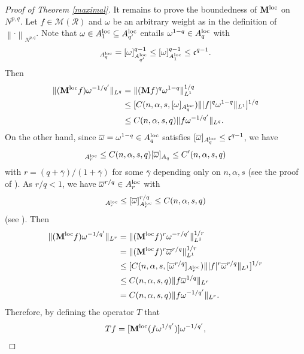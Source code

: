 \documentclass[10pt,reqno]{amsart}
\numberwithin{equation}{section}
\begin{document}
\begin{proof}[Proof of Theorem \ref{maximal}]
It remains to prove the boundedness of ${\bf M}^{\rm loc}$ on $N^{p,q}$. Let $f\in\mathcal{M}(\mathcal{R})$ and $\omega$ be an arbitrary weight as in the definition of $\left\|\cdot\right\|_{N^{p,q}}$. Note that $\omega\in A_{1}^{\rm loc}\subseteq A_{q'}^{\rm loc}$ entails $\omega^{1-q}\in A_{q}^{\rm loc}$ with 
\begin{align*}
[\omega^{1-q}]_{A_{q}^{\rm loc}}=[\omega]_{A_{q'}^{\rm loc}}^{q-1}\leq[\omega]_{A_{1}^{\rm loc}}^{q-1}\leq\mathfrak{c}^{q-1}.
\end{align*}
Then
\begin{align*}
\|({\bf M}^{\rm loc}f)\omega^{-1/q'}\|_{L^{q}}&=\|({\bf M}f)^{q}\omega^{1-q}\|_{L^{1}}^{1/q}\\
&\leq[C(n,\alpha,s,[\omega]_{A_{q}^{\rm loc}})\||f|^{q}\omega^{1-q}\|_{L^{1}}]^{1/q}\\
&\leq C(n,\alpha,s,q)\|f\omega^{-1/q'}\|_{L^{q}}.
\end{align*}
On the other hand, since $\overline{\omega}=\omega^{1-q}\in A_{q}^{\rm loc}$ satisfies $[\overline{\omega}]_{A_{q}^{\rm loc}}\leq\mathfrak{c}^{q-1}$, we have 
\begin{align*}
[\overline{\omega}]_{A_{r}^{\rm loc}}\leq C(n,\alpha,s,q)[\overline{\omega}]_{A_{q}}\leq C'(n,\alpha,s,q)
\end{align*}
with $r=(q+\overline{\gamma})/(1+\overline{\gamma})$ for some $\overline{\gamma}$ depending only on $n,\alpha,s$ (see the proof of \cite[Corollary 2.4.6]{OK4}). As $r/q<1$, we have $\overline{\omega}^{r/q}\in A_{r}^{\rm loc}$ with
\begin{align*}
[\overline{\omega}^{r/q}]_{A_{r}^{\rm loc}}\leq[\overline{\omega}]_{A_{r}^{\rm loc}}^{r/q}\leq C(n,\alpha,s,q)
\end{align*}
(see \cite[Lemma 2.1.4]{OK4}). Then
\begin{align*}
\|({\bf M}^{\rm loc}f)\omega^{-1/q'}\|_{L^{r}}&=\|({\bf M}^{\rm loc}f)^{r}\omega^{-r/q'}\|_{L^{1}}^{1/r}\\
&=\|({\bf M}^{\rm loc}f)^{r}\overline{\omega}^{r/q}\|_{L^{1}}^{1/r}\\
&\leq[C(n,\alpha,s,[\overline{\omega}^{r/q}]_{A_{r}^{\rm loc}})\||f|^{r}\overline{\omega}^{r/q}\|_{L^{1}}]^{1/r}\\
&\leq C(n,\alpha,s,q)\|f\overline{\omega}^{1/q}\|_{L^{r}}\\
&=C(n,\alpha,s,q)\|f\omega^{-1/q'}\|_{L^{r}}.
\end{align*}
Therefore, by defining the operator $T$ that 
\begin{align*}
Tf=[{\bf M}^{\rm loc}(f\omega^{1/q'})]\omega^{-1/q'},

\end{align*}
\end{proof}
\end{document}
